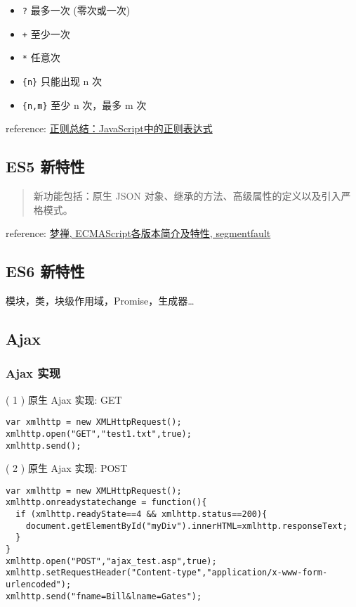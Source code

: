 \begin{itemize}
\item \texttt{?} 最多一次 (零次或一次)
\item \texttt{+} 至少一次
\item \texttt{*} 任意次
\item \texttt{\{n\}} 只能出现 n 次
\item \texttt{\{n,m\}} 至少 n 次，最多 m 次
\end{itemize}

reference: \href{http://www.nowamagic.net/librarys/veda/detail/1283}{正则总结：JavaScript中的正则表达式}

\subsection{ES5 新特性}\hypertarget{es5-}{}\label{es5-}

\begin{quote}
新功能包括：原生 JSON 对象、继承的方法、高级属性的定义以及引入严格模式。
\end{quote}

reference: \href{http://segmentfault.com/a/1190000003493604}{梦禅, ECMAScript各版本简介及特性, segmentfault}

\subsection{ES6 新特性}\hypertarget{es6-}{}\label{es6-}

模块，类，块级作用域，Promise，生成器\ldots{}

\subsection{Ajax}\hypertarget{ajax}{}\label{ajax}

\subsubsection{Ajax 实现}\hypertarget{ajax-}{}\label{ajax-}

( 1 ) 原生 Ajax 实现: GET

\begin{verbatim}var xmlhttp = new XMLHttpRequest();
xmlhttp.open("GET","test1.txt",true);
xmlhttp.send();
\end{verbatim}

( 2 ) 原生 Ajax 实现: POST

\begin{verbatim}var xmlhttp = new XMLHttpRequest();
xmlhttp.onreadystatechange = function(){
  if (xmlhttp.readyState==4 && xmlhttp.status==200){
    document.getElementById("myDiv").innerHTML=xmlhttp.responseText;
  }
}
xmlhttp.open("POST","ajax_test.asp",true);
xmlhttp.setRequestHeader("Content-type","application/x-www-form-urlencoded");
xmlhttp.send("fname=Bill&lname=Gates");
\end{verbatim}

